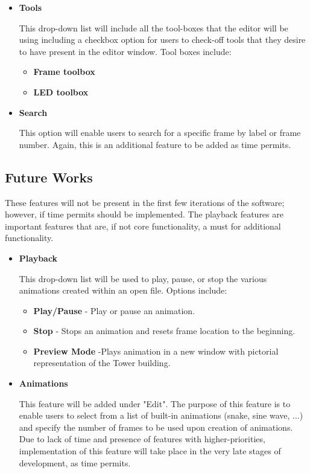 \documentclass[12pt]{extarticle}
\begin{document}
\begin{itemize}
\item \textbf{Tools}

{This drop-down list will include all the tool-boxes that the editor will be using including a checkbox option for users to check-off tools that they desire to have present in the editor window. Tool boxes include:}

	\begin{itemize}
	\item \textbf{Frame toolbox}
	\item \textbf{LED toolbox}

	\end{itemize}

\item \textbf{Search}

{This option will enable users to search for a specific frame by label or frame number.  Again, this is an additional feature to be added as time permits.}

\end{itemize}

\subsection{Future Works}

{These features will not be present in the first few iterations of the software; however, if time permits should be implemented.  The playback features are important features that are, if not core functionality, a must for additional functionality. }

\begin{itemize}
\item \textbf{Playback}

{This drop-down list will be used to play, pause, or stop the various animations created within an open file. Options include: }
	\begin{itemize}
	\item \textbf{Play/Pause} - Play or pause an animation.
	\item \textbf{Stop} - Stops an animation and resets frame location to the beginning.
	\item \textbf{Preview Mode} -Plays animation in a new window with pictorial representation of the Tower building.

	\end{itemize}

\item \textbf{Animations}

{This feature will be added under "Edit". The purpose of this feature is to enable users to select from a list of built-in animations (snake, sine wave, ...) and specify the number of frames to be used upon creation of animations. Due to lack of time and presence of features with higher-priorities, implementation of this feature will take place in the very late stages of development, as time permits. }

\end{itemize}
\end{document}
